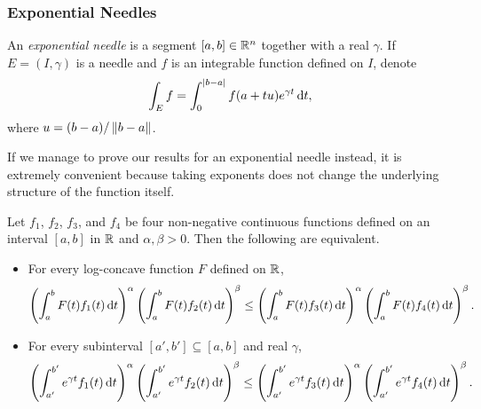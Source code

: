 	\subsubsection{Exponential Needles}
	\label{sec: 5.1.3}

		\begin{definition}
			An \textit{exponential needle} is a segment $[a,b]\in\mathbb{R}^n$ together with a real $\gamma$. If $E=(I,\gamma)$ is a needle and $f$ is an integrable function defined on $I$, denote
			\[ \int_E f = \int_{0}^{|b-a|} f(a+tu)e^{\gamma t} \operatorname{d}\!{t}, \]
			where $u=(b-a)/\left\lVert b-a\right\rVert$.
		\end{definition}

		If we manage to prove our results for an exponential needle instead, it is extremely convenient because taking exponents does not change the underlying structure of the function itself.

		\begin{lemma}
			\label{localized exponential needle interconversion}
			Let $f_1$, $f_2$, $f_3$, and $f_4$ be four non-negative continuous functions defined on an interval $[a,b]$ in $\mathbb{R}$ and $\alpha,\beta>0$. Then the following are equivalent.
			\begin{itemize}
				\item For every log-concave function $F$ defined on $\mathbb{R}$, 
				\[ \left(\int_a^b F(t)f_1(t)\operatorname{d}\!{t}\right)^\alpha \left(\int_a^b F(t)f_2(t)\operatorname{d}\!{t}\right)^\beta \leq \left(\int_a^b F(t)f_3(t)\operatorname{d}\!{t}\right)^\alpha \left(\int_a^b F(t)f_4(t)\operatorname{d}\!{t}\right)^\beta. \]

				\item For every subinterval $[a',b']\subseteq[a,b]$ and real $\gamma$,
				\[ \left(\int_{a'}^{b'} e^{\gamma t}f_1(t)\operatorname{d}\!{t}\right)^\alpha \left(\int_{a'}^{b'} e^{\gamma t}f_2(t)\operatorname{d}\!{t}\right)^\beta \leq \left(\int_{a'}^{b'} e^{\gamma t}f_3(t)\operatorname{d}\!{t}\right)^\alpha \left(\int_{a'}^{b'} e^{\gamma t}f_4(t)\operatorname{d}\!{t}\right)^\beta. \]
			\end{itemize}
		\end{lemma}


